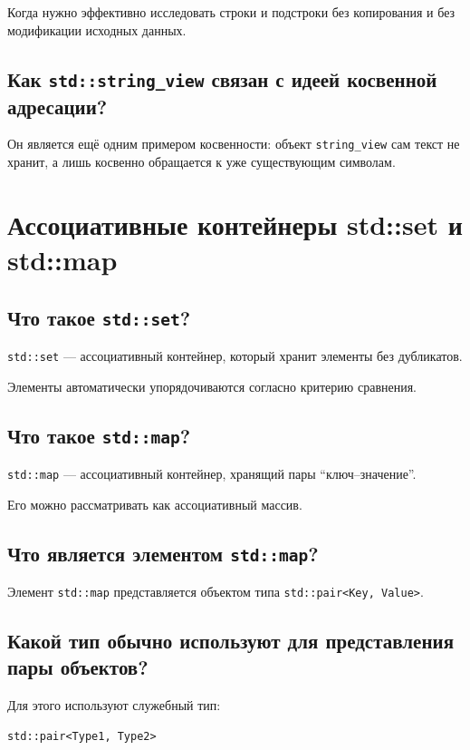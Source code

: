 Когда нужно эффективно исследовать строки и подстроки без копирования и без модификации исходных данных.


\subsection{Как \texttt{std::string\_view} связан с идеей косвенной адресации?}

Он является ещё одним примером косвенности: объект \texttt{string\_view} сам текст не хранит, а лишь косвенно обращается к уже существующим символам.



\section{Ассоциативные контейнеры std::set и std::map}

\subsection{Что такое \texttt{std::set}?}

\texttt{std::set} --- ассоциативный контейнер, который хранит элементы без дубликатов.

Элементы автоматически упорядочиваются согласно критерию сравнения.


\subsection{Что такое \texttt{std::map}?}

\texttt{std::map} --- ассоциативный контейнер, хранящий пары ``ключ--значение''.

Его можно рассматривать как ассоциативный массив.


\subsection{Что является элементом \texttt{std::map}?}

Элемент \texttt{std::map} представляется объектом типа \texttt{std::pair<Key, Value>}.


\subsection{Какой тип обычно используют для представления пары объектов?}

Для этого используют служебный тип:
\begin{verbatim}
std::pair<Type1, Type2>
\end{verbatim}

